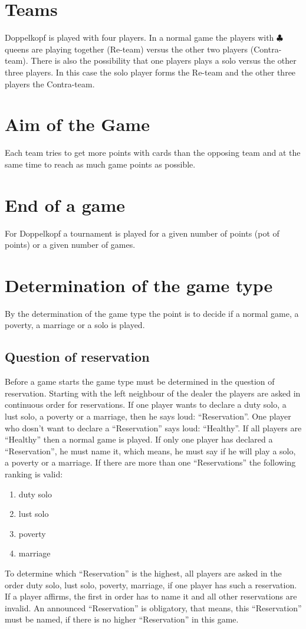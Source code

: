 \documentclass[12pt,a4paper]{article}
\newcommand{\kreuz}{$\clubsuit$}
\begin{document}
\section{Teams} Doppelkopf is played with four players. In a
normal game the players with \kreuz queens are playing together
(Re-team) versus the other two players (Contra-team). There is
also the possibility that one players plays a solo versus the
other three players. In this case the solo player forms the
Re-team and the other three players the Contra-team.
\section{Aim of the Game } Each team tries to get more points
with cards than the opposing team and at the same time to reach
as much game points as possible.
\section{End of a game}
For Doppelkopf a tournament is played for a given number of
points (pot of points) or a given number of games.
\section{Determination of the game type}
By the determination of the game
type the point is to decide if a normal game, a poverty, a
marriage or a solo is played.
\subsection{Question of reservation} Before a game starts the game type must be
determined in the question of reservation. Starting with the left
neighbour of the dealer the players are asked in continuous
order for reservations. If one player wants to declare a duty
solo, a lust solo, a poverty or a marriage, then he says loud:
"`Reservation"'. One player who dosn't want to declare a
"`Reservation"' says loud: "`Healthy"'. If all players are
"`Healthy"' then a normal game is played. If only one player
has declared a "`Reservation"', he must name it, which means, he
must say if he will play a solo, a poverty or a marriage. If
there are more than one "`Reservations"' the following ranking is
valid:
\begin{enumerate}
\item duty solo
\item lust solo
\item poverty
\item marriage
\end{enumerate}
To determine which "`Reservation"' is the highest, all players are asked in the order duty solo, lust solo, poverty, marriage, if one player has such a reservation.
If a player affirms, the first in order has to name it and all other reservations are invalid.
An announced "`Reservation"' is obligatory, that
means, this "`Reservation"' must be named, if there is no higher
"`Reservation"' in this game.
\end{document}
